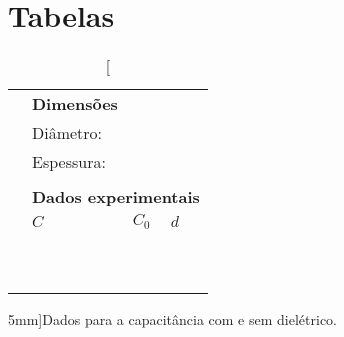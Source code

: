 \vfill
\pagebreak
\section{Tabelas}

\begin{table*}[!h]
\centering
\begin{tabular}{lp{25mm}p{25mm}p{25mm}l}
\toprule
	& \multicolumn{2}{l}{\textbf{Dimensões}} \\
	\cmidrule{2-3}
	& Diâmetro: \cellcolor[gray]{0.89} & \cellcolor[gray]{0.92} \\
	& Espessura: \cellcolor[gray]{0.95} & \cellcolor[gray]{0.97} \\
	\cmidrule{2-3}
\\
	& \multicolumn{4}{l}{\textbf{Dados experimentais}} \\
	\cmidrule{2-4}
	& $C$ & $C_0$ & $d$ & \\
	\cmidrule{2-4}
	& \cellcolor[gray]{0.89} & \cellcolor[gray]{0.92} & \cellcolor[gray]{0.89} & \\
	& \cellcolor[gray]{0.95} & \cellcolor[gray]{0.97} & \cellcolor[gray]{0.95} & \\
	& \cellcolor[gray]{0.89} & \cellcolor[gray]{0.92} & \cellcolor[gray]{0.89} & \\
	& \cellcolor[gray]{0.95} & \cellcolor[gray]{0.97} & \cellcolor[gray]{0.95} & \\
	& \cellcolor[gray]{0.89} & \cellcolor[gray]{0.92} & \cellcolor[gray]{0.89} & \\
	& \cellcolor[gray]{0.95} & \cellcolor[gray]{0.97} & \cellcolor[gray]{0.95} & \\
	& \cellcolor[gray]{0.89} & \cellcolor[gray]{0.92} & \cellcolor[gray]{0.89} & \\
	& \cellcolor[gray]{0.95} & \cellcolor[gray]{0.97} & \cellcolor[gray]{0.95} & \\
	& \cellcolor[gray]{0.89} & \cellcolor[gray]{0.92} & \cellcolor[gray]{0.89} & \\
	& \cellcolor[gray]{0.95} & \cellcolor[gray]{0.97} & \cellcolor[gray]{0.95} & \\
	\cmidrule{2-4}
\bottomrule
\end{tabular}
\caption[][5mm]{Dados para a capacitância com e sem dielétrico.}
\label{Tab:ValoresCapacitancia}
\end{table*}

